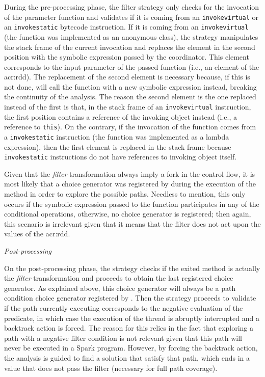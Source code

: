 During the pre-processing phase, the filter strategy only checks for the invocation of the parameter function and validates if it is coming from an \texttt{invokevirtual} or an \texttt{invokestatic} bytecode instruction. If it is coming from an \texttt{invokevirtual} (the function was implemented as an anonymous class), the strategy manipulates the stack frame of the current invocation and replaces the element in the second position with the symbolic expression passed by the coordinator. This element corresponds to the input parameter of the passed function (i.e., an element of the \acrshort{acr:rdd}). The replacement of the second element is necessary because, if this is not done, \spf{} will call the function with a new symbolic expression instead, breaking the continuity of the analysis. The reason the second element is the one replaced instead of the first is that, in the stack frame of an \texttt{invokevirtual} instruction, the first position contains a reference of the invoking object instead (i.e., a reference to \texttt{this}). On the contrary, if the invocation of the function comes from a \texttt{invokestatic} instruction (the function was implemented as a lambda expression), then the first element is replaced in the stack frame because \texttt{invokestatic} instructions do not have references to invoking object itself.

Given that the \textit{filter} transformation always imply a fork in the control flow, it is most likely that a choice generator was registered by \spf{}
during the execution of the method in order to explore the possible paths. Needless to mention, this only occurs if the symbolic expression passed to the function participates in any of the conditional operations, otherwise, no choice generator is registered; then again, this scenario is irrelevant given that it means that the filter does not act upon the values of the \acrshort{acr:rdd}.

\textit{Post-processing}

On the post-processing phase, the strategy checks if the exited method is actually the \textit{filter} transformation and proceeds to obtain the last registered choice generator. As explained above, this choice generator will always be a path condition choice generator registered by \spf{}. Then the strategy proceeds to validate if the path currently executing corresponds to the negative evaluation of the predicate, in which case the execution of the thread is abruptly interrupted and a backtrack action is forced. The reason for this relies in the fact that exploring a path with a negative filter condition is not relevant given that this path will never be executed in a Spark program. However, by forcing the backtrack action, the analysis is guided to find a solution that satisfy that path, which ends in a value that does not pass the filter (necessary for full path coverage).

